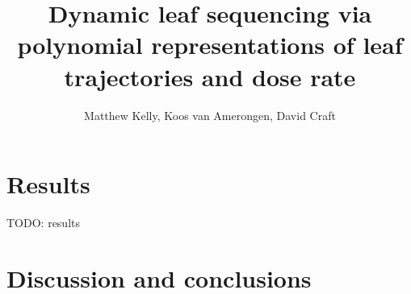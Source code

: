 

\title{Dynamic leaf sequencing via polynomial representations of leaf trajectories and dose rate}

\author{Matthew Kelly, Koos van Amerongen, David Craft}



\maketitle
\thispagestyle{empty}









\section{Results}

TODO:  results

\section{Discussion and conclusions}





